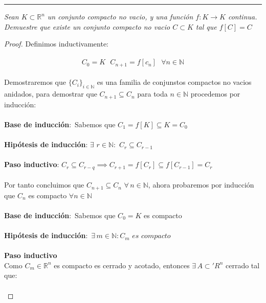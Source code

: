 \documentclass[11pt,letterpaper]{article}
\newcommand{\R}{\mathbb{R}}
\newcommand{\N}{\mathbb{N}}
\begin{document}
\rule{17cm}{0.1mm}

\begin{tcolorbox}[
	title = \textcolor{black}{\textcolor{white}{Problema 1}},]
\textit{Sean $K\subset \R^n$ un conjunto compacto no vacio, y una funci\'on $f:K\rightarrow K$ continua.
Demuestre que existe un conjunto compacto no vacio $C\subset K$ tal que $f[C]=C$
}
\end{tcolorbox}
\begin{proof}
    Definimos inductivamente:\,\\
    \,\\
    \begin{equation*}
        C_0=K\,\,\,\,C_{n+1}=f[c_n]\,\,\,\,\forall n\in \N
    \end{equation*}\,\\
    Demostraremos que $\{C_i\}_{i\in \N}$ es una familia de conjunstos compactos no vacios anidados, para demostrar que $C_{n+1}\subseteq C_{n}$ para toda $n\in \N$
    procedemos por inducci\'on:\,\\
    \,\\
    \textbf{Base de inducci\'on}:\,\,\,Sabemos que $C_1=f[K]\subseteq K=C_0$\,\\
    \,\\
    \textbf{Hip\'otesis de inducci\'on}:\,\,$\exists\,\,r\in \N:\,\,C_{r}\subseteq C_{r-1}$\,\\
    \,\\
    \textbf{Paso inductivo}: $C_{r}\subseteq C_{r-q}\implies C_{r+1}=f[C_r]\subseteq f[C_{r-1}]=C_{r}$\,\\
    \,\\
    Por tanto concluimos que $C_{n+1}\subseteq C_n$ $\forall\,n\in \N$, ahora probaremos por inducci\'on que $C_n$ es compacto
    $\forall n\in \N$\,\\
    \,\\
    \textbf{Base de inducci\'on}:\,\,\,Sabemos que $C_0=K$ es compacto\,\\
    \,\\
    \textbf{Hip\'otesis de inducci\'on}:\,\,\,$\exists\,m\in \N: C_m\,\,es\,\,compacto$\,\\
    \,\\
    \textbf{Paso inductivo}\,\\Como $C_m\in \R^n$ es compacto es cerrado y acotado, entonces $\exists\,A\subset 'R^n$ cerrado tal que:\,\\
    \,\\
    \begin{equation*}

\end{equation*}
\end{proof}
\end{document}
